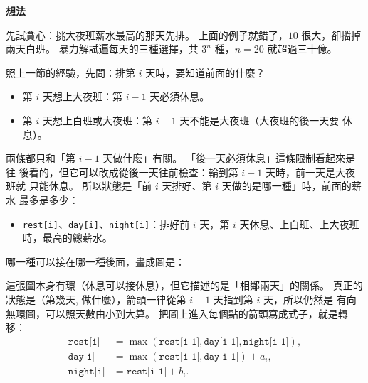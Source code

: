 \textbf{想法}

先試貪心：挑大夜班薪水最高的那天先排。 上面的例子就錯了，$10$ 很大，卻擋掉
兩天白班。 暴力解試遍每天的三種選擇，共 $3^n$ 種，$n = 20$ 就超過三十億。

照上一節的經驗，先問：排第 $i$ 天時，要知道前面的什麼？

\begin{itemize}
\item 第 $i$ 天想上大夜班：第 $i - 1$ 天必須休息。
\item 第 $i$ 天想上白班或大夜班：第 $i - 1$ 天不能是大夜班（大夜班的後一天要
休息）。
\end{itemize}

兩條都只和「第 $i - 1$ 天做什麼」有關。 「後一天必須休息」這條限制看起來是往
後看的，但它可以改成從後一天往前檢查：輪到第 $i + 1$ 天時，前一天是大夜班就
只能休息。 所以狀態是「前 $i$ 天排好、第 $i$ 天做的是哪一種」時，前面的薪水
最多是多少：

\begin{itemize}
\item \texttt{rest[i]}、\texttt{day[i]}、\texttt{night[i]}：排好前 $i$ 天，第
$i$ 天休息、上白班、上大夜班時，最高的總薪水。
\end{itemize}

哪一種可以接在哪一種後面，畫成圖是：

\begin{center}
\label{fig:night-states}
\end{center}

這張圖本身有環（休息可以接休息），但它描述的是「相鄰兩天」的關係。 真正的
狀態是（第幾天, 做什麼），箭頭一律從第 $i - 1$ 天指到第 $i$ 天，所以仍然是
有向無環圖，可以照天數由小到大算。 把圖上進入每個點的箭頭寫成式子，就是轉
移：
\[
\begin{aligned}
\texttt{rest[i]}  &= \max(\texttt{rest[i-1]}, \texttt{day[i-1]}, \texttt{night[i-1]}),\\
\texttt{day[i]}   &= \max(\texttt{rest[i-1]}, \texttt{day[i-1]}) + a_i,\\
\texttt{night[i]} &= \texttt{rest[i-1]} + b_i.
\end{aligned}
\]

